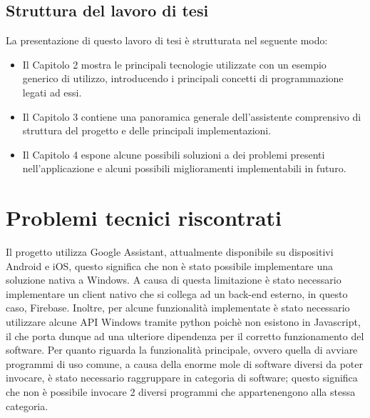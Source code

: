 \subsection{Struttura del lavoro di tesi}
La presentazione di questo lavoro di tesi è strutturata nel seguente modo:
\begin{itemize}
    \item Il Capitolo 2 mostra le principali tecnologie utilizzate con un esempio generico di utilizzo, introducendo i principali concetti di programmazione legati ad essi.
    \item Il Capitolo 3 contiene una panoramica generale dell'assistente comprensivo di struttura del progetto e delle principali implementazioni.
    \item Il Capitolo 4 espone alcune possibili soluzioni a dei problemi presenti nell'applicazione e alcuni possibili miglioramenti implementabili in futuro.
\end{itemize}

\section{Problemi tecnici riscontrati}
Il progetto utilizza Google Assistant, attualmente disponibile su dispositivi Android e iOS, questo significa che non è stato possibile implementare una soluzione nativa a Windows.
A causa di questa limitazione è stato necessario implementare un client nativo che si collega ad un back-end esterno, in questo caso, Firebase.
Inoltre, per alcune funzionalità implementate è stato necessario utilizzare alcune API Windows tramite python poichè non esistono in Javascript, il che porta dunque ad una ulteriore dipendenza per il corretto funzionamento del software.
Per quanto riguarda la funzionalità principale, ovvero quella di avviare programmi di uso comune, a causa della enorme mole di software diversi da poter invocare, è stato necessario raggruppare in categoria di software; questo significa che non è possibile invocare 2 diversi programmi che appartenengono alla stessa categoria.